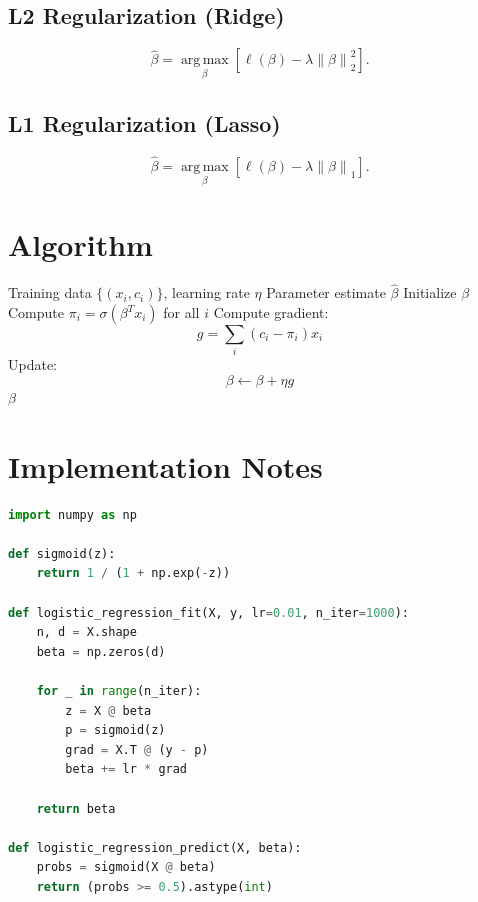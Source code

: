 \documentclass[12pt,oneside]{book}
\numberwithin{equation}{section}
\theoremstyle{definition}
\theoremstyle{plain}
\theoremstyle{remark}
\newcommand{\argmax}{\operatorname*{arg\,max}}
\newcommand{\norm}[1]{\left\lVert #1 \right\rVert}
\begin{document}
\subsection{L2 Regularization (Ridge)}

\[
\hat{\beta}
=
\argmax_{\beta}
\left[
\ell(\beta) - \lambda \norm{\beta}_2^2
\right].
\]

\subsection{L1 Regularization (Lasso)}

\[
\hat{\beta}
=
\argmax_{\beta}
\left[
\ell(\beta) - \lambda \norm{\beta}_1
\right].
\]

\section{Algorithm}

\begin{algorithm}[H]
\caption{Logistic Regression via Gradient Ascent}
\begin{algorithmic}[1]
\Require Training data $\{(x_i,c_i)\}$, learning rate $\eta$
\Ensure Parameter estimate $\hat{\beta}$
\State Initialize $\beta$
    \State Compute $\pi_i = \sigma(\beta^T x_i)$ for all $i$
    \State Compute gradient:
    \[
    g = \sum_i (c_i - \pi_i)x_i
    \]
    \State Update:
    \[
    \beta \gets \beta + \eta g
    \]
\EndFor
\State \Return $\beta$
\end{algorithmic}
\end{algorithm}

\section{Implementation Notes}

\begin{lstlisting}[language=Python]
import numpy as np

def sigmoid(z):
    return 1 / (1 + np.exp(-z))

def logistic_regression_fit(X, y, lr=0.01, n_iter=1000):
    n, d = X.shape
    beta = np.zeros(d)

    for _ in range(n_iter):
        z = X @ beta
        p = sigmoid(z)
        grad = X.T @ (y - p)
        beta += lr * grad

    return beta

def logistic_regression_predict(X, beta):
    probs = sigmoid(X @ beta)
    return (probs >= 0.5).astype(int)
\end{lstlisting}
\end{document}
